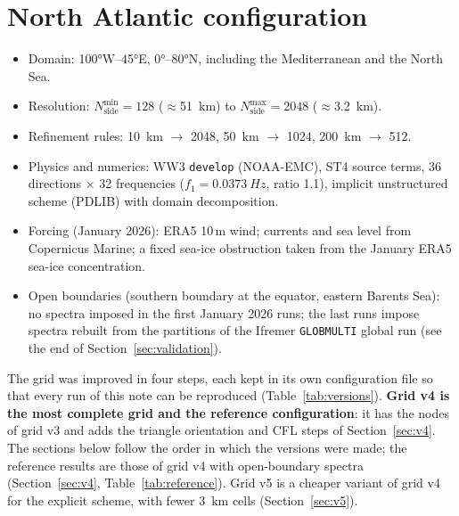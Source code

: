 \documentclass[11pt,a4paper]{article}
\newcommand{\nside}{N_{\mathrm{side}}}
\begin{document}
\section{North Atlantic configuration}
\begin{itemize}
\item Domain: \ang{100}W--\ang{45}E, \ang{0}--\ang{80}N, including the
  Mediterranean and the North Sea.
\item Resolution: $\nside^{\min}=128$ (\(\approx\)\SI{51}{km}) to
  $\nside^{\max}=2048$ (\(\approx\)\SI{3.2}{km}).
\item Refinement rules: \SI{10}{km} $\to$ 2048, \SI{50}{km} $\to$ 1024,
  \SI{200}{km} $\to$ 512.
\item Physics and numerics: WW3 \texttt{develop} (NOAA-EMC), ST4 source
  terms, 36 directions $\times$ 32 frequencies ($f_1=\SI{0.0373}{Hz}$,
  ratio 1.1), implicit unstructured scheme (PDLIB) with domain
  decomposition.
\item Forcing (January 2026): ERA5 10\,m wind; currents and sea level from
  Copernicus Marine; a fixed sea-ice obstruction taken from the January ERA5
  sea-ice concentration.
\item Open boundaries (southern boundary at the equator, eastern Barents
  Sea): no spectra imposed in the first January 2026 runs; the last runs
  impose spectra rebuilt from the partitions of the Ifremer
  \texttt{GLOBMULTI} global run (see the end of
  Section~\ref{sec:validation}).
\end{itemize}

The grid was improved in four steps, each kept in its own configuration
file so that every run of this note can be reproduced
(Table~\ref{tab:versions}). \textbf{Grid v4 is the most complete grid and
the reference configuration}: it has the nodes of grid v3 and adds the
triangle orientation and CFL steps of Section~\ref{sec:v4}. The sections
below follow the order in which the versions were made; the reference
results are those of grid v4 with open-boundary spectra
(Section~\ref{sec:v4}, Table~\ref{tab:reference}). Grid v5 is a cheaper
variant of grid v4 for the explicit scheme, with fewer \SI{3}{km} cells
(Section~\ref{sec:v5}).
\end{document}
